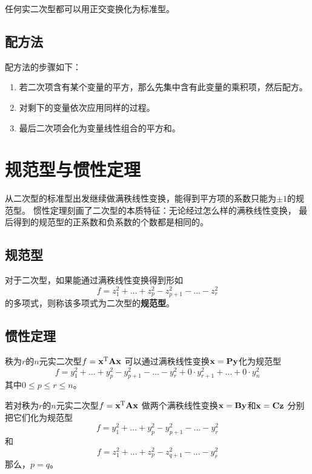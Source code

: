 \begin{theorem}[主轴定理]
  任何实二次型都可以用正交变换化为标准型。
\end{theorem}

\subsection{配方法}
配方法的步骤如下：
\begin{enumerate}
  \item 
  若二次项含有某个变量的平方，那么先集中含有此变量的乘积项，然后配方。
  \item
  对剩下的变量依次应用同样的过程。
  \item
  最后二次项会化为变量线性组合的平方和。
\end{enumerate}

\section{规范型与惯性定理}
从二次型的标准型出发继续做满秩线性变换，能得到平方项的系数只能为$\pm 1$的规范型。
惯性定理刻画了二次型的本质特征：无论经过怎么样的满秩线性变换，
最后得到的规范型的正系数和负系数的个数都是相同的。

\subsection{规范型}
\begin{definition}[规范型]
  对于二次型，如果能通过满秩线性变换得到形如
  \begin{displaymath}
    f = z_1^2+\dots+z_p^2-z_{p+1}^2-\dots-z_{r}^2
  \end{displaymath}
  的多项式，则称该多项式为二次型的\textbf{规范型}。
\end{definition}

\subsection{惯性定理}
\begin{theorem}
  秩为$r$的$n$元实二次型$f=\mathbf{x}^{\textrm{T}}\mathbf{A}\mathbf{x}$
  可以通过满秩线性变换$\mathbf{x}=\mathbf{P}\mathbf{y}$化为规范型
  \begin{displaymath}
    f = y_1^2+\dots+y_p^2-y_{p+1}^2-\dots-y_{r}^2
    + 0\cdot y_{r+1}^2 + \dots + 0\cdot y_{n}^2
  \end{displaymath}
  其中$0\le p \le r \le n$。
\end{theorem}

\begin{theorem}[惯性定理]
  若对秩为$r$的$n$元实二次型$f=\mathbf{x}^{\textrm{T}}\mathbf{A}\mathbf{x}$
  做两个满秩线性变换$\mathbf{x}=\mathbf{B}\mathbf{y}$和$\mathbf{x}=\mathbf{C}\mathbf{z}$
  分别把它们化为规范型
  \begin{displaymath}
  f = y_1^2+\dots+y_p^2-y_{p+1}^2-\dots-y_{r}^2
  \end{displaymath}
  和
  \begin{displaymath}
  f = z_1^2+\dots+z_p^2-z_{q+1}^2-\dots-y_{r}^2
  \end{displaymath}
  那么，$p=q$。
\end{theorem}

